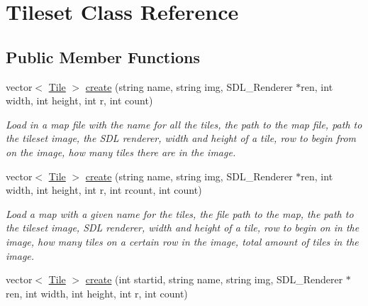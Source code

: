\hypertarget{classTileset}{}\section{Tileset Class Reference}
\label{classTileset}
\subsection*{Public Member Functions}
\begin{DoxyCompactItemize}
\item 
vector$<$ \hyperlink{classTile}{Tile} $>$ \hyperlink{classTileset_ad11cd044d9a2907003fee3baacba86e7}{create} (string name, string img, S\+D\+L\+\_\+\+Renderer $\ast$ren, int width, int height, int r, int count)\hypertarget{classTileset_ad11cd044d9a2907003fee3baacba86e7}{}\label{classTileset_ad11cd044d9a2907003fee3baacba86e7}

\begin{DoxyCompactList}\small\item\em Load in a map file with the name for all the tiles, the path to the map file, path to the tileset image, the S\+DL renderer, width and height of a tile, row to begin from on the image, how many tiles there are in the image. \end{DoxyCompactList}\item 
vector$<$ \hyperlink{classTile}{Tile} $>$ \hyperlink{classTileset_a1435c7ce70c5aa6da6388762971917aa}{create} (string name, string img, S\+D\+L\+\_\+\+Renderer $\ast$ren, int width, int height, int r, int rcount, int count)\hypertarget{classTileset_a1435c7ce70c5aa6da6388762971917aa}{}\label{classTileset_a1435c7ce70c5aa6da6388762971917aa}

\begin{DoxyCompactList}\small\item\em Load a map with a given name for the tiles, the file path to the map, the path to the tileset image, S\+DL renderer, width and height of a tile, row to begin on in the image, how many tiles on a certain row in the image, total amount of tiles in the image. \end{DoxyCompactList}\item 
vector$<$ \hyperlink{classTile}{Tile} $>$ \hyperlink{classTileset_a9d93cb00fc20938748075d94be118ed6}{create} (int startid, string name, string img, S\+D\+L\+\_\+\+Renderer $\ast$ren, int width, int height, int r, int count)\hypertarget{classTileset_a9d93cb00fc20938748075d94be118ed6}{}\label{classTileset_a9d93cb00fc20938748075d94be118ed6}


\end{DoxyCompactItemize}
